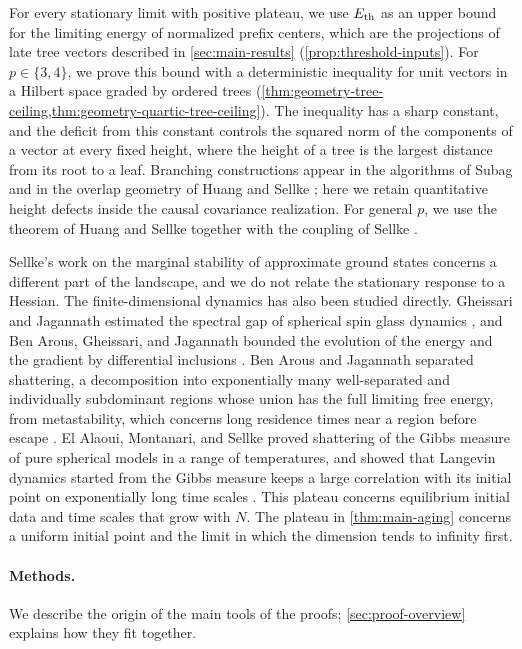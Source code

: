 For every stationary limit with positive plateau, we use $E_{\mathrm{th}}$ as an upper bound for the limiting energy of normalized prefix centers, which are the projections of late tree vectors described in \cref{sec:main-results} (\cref{prop:threshold-inputs}). For $p\in\{3,4\}$, we prove this bound with a deterministic inequality for unit vectors in a Hilbert space graded by ordered trees (\cref{thm:geometry-tree-ceiling,thm:geometry-quartic-tree-ceiling}). The inequality has a sharp constant, and the deficit from this constant controls the squared norm of the components of a vector at every fixed height, where the height of a tree is the largest distance from its root to a leaf. Branching constructions appear in the algorithms of Subag \cite[Remark~6]{subag2021} and in the overlap geometry of Huang and Sellke \cite[Remarks~1.2 and~1.3]{hs2021}; here we retain quantitative height defects inside the causal covariance realization. For general $p$, we use the theorem of Huang and Sellke \cite{hs2023} together with the coupling of Sellke \cite[Lemmas~3.1 and~3.2]{sellke2024}.

Sellke's work on the marginal stability of approximate ground states \cite{sellke2025} concerns a different part of the landscape, and we do not relate the stationary response to a Hessian. The finite-dimensional dynamics has also been studied directly. Gheissari and Jagannath estimated the spectral gap of spherical spin glass dynamics \cite{gj2019}, and Ben Arous, Gheissari, and Jagannath bounded the evolution of the energy and the gradient by differential inclusions \cite{bgj2020}. Ben Arous and Jagannath separated shattering, a decomposition into exponentially many well-separated and individually subdominant regions whose union has the full limiting free energy, from metastability, which concerns long residence times near a region before escape \cite{bj2024}. El Alaoui, Montanari, and Sellke proved shattering of the Gibbs measure of pure spherical models in a range of temperatures, and showed that Langevin dynamics started from the Gibbs measure keeps a large correlation with its initial point on exponentially long time scales \cite[Corollary~2.9]{shattering2025}. This plateau concerns equilibrium initial data and time scales that grow with $N$. The plateau in \cref{thm:main-aging} concerns a uniform initial point and the limit in which the dimension tends to infinity first.

\paragraph{Methods.}
We describe the origin of the main tools of the proofs; \cref{sec:proof-overview} explains how they fit together.

